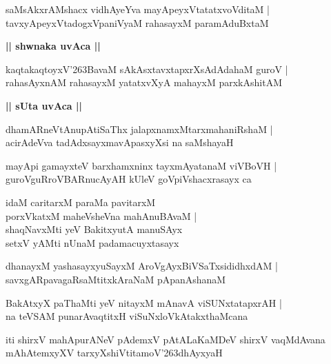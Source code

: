 \documentclass[twoside,12pt,openright]{book}
\def\S{\char'263}
\newcounter{shloka}[chapter]
\def\uvaca#1{\centerline{{\large\textbf{#1}}}}
\begin{document}
\begin{shloka}%
saMsAkxrAMshacx vidhAyeYva mayApeyxVtatatxvoVditaM |\\
tavxyApeyxVtadogxVpaniVyaM rahasayxM paramAduBxtaM 
\end{shloka}

\uvaca {|| shwnaka uvAca ||}

\begin{shloka}%
kaqtakaqtoyxV\S BavaM sAkAsxtavxtapxrXsAdAdahaM guroV |\\
rahasAyxnAM rahasayxM yatatxvXyA mahayxM parxkAshitAM 
\end{shloka}

\uvaca {|| sUta uvAca ||}

\begin{shloka}%
dhamARneVtAnupAtiSaThx jalapxnamxMtarxmahaniRshaM |\\
acirAdeVva tadAdxsayxmavApasxyXsi na saMshayaH
\end{shloka}

\begin{shloka}%
mayApi gamayxteV barxhamxninx tayxmAyatanaM viVBoVH |\\
guroVguRroVBARnucAyAH kUleV goVpiVshacxrasayx ca 
\end{shloka}

\begin{shloka}%
idaM caritarxM paraMa pavitarxM \\
porxVkatxM maheVsheVna mahAnuBAvaM |\\
shaqNavxMti yeV BakitxyutA manuSAyx \\
setxV yAMti nUnaM padamacuyxtasayx 
\end{shloka}

\begin{shloka}%
dhanayxM yashasayxyuSayxM AroVgAyxBiVSaTxsididhxdAM |\\
savxgARpavagaRsaMtitxkAraNaM pApanAshanaM 
\end{shloka}

\begin{shloka}%
BakAtxyX paThaMti yeV nitayxM mAnavA viSUNxtatapxrAH |\\
na teVSAM punarAvaqtitxH viSuNxloVkAtakxthaMcana
\end{shloka}

\begin{center}
iti shirxV mahApurANeV pAdemxV pAtALaKaMDeV  shirxV vaqMdAvana mAhAtemxyXV 
tarxyXshiVtitamoV\S dhAyxyaH
\end{center}
\end{document}
